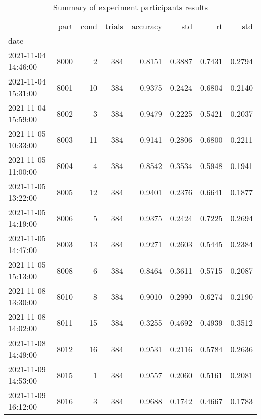 \begin{table}
\centering
\caption{Summary of experiment participants results}
\label{table-subject-summary}
\begin{tabular}{lrrrrrrr}
\toprule
{} &  part & cond & trials & accuracy &    std &     rt &    std \\
date                &       &      &        &          &        &        &        \\
\midrule
2021-11-04 14:46:00 &  8000 &    2 &    384 &   0.8151 & 0.3887 & 0.7431 & 0.2794 \\
2021-11-04 15:31:00 &  8001 &   10 &    384 &   0.9375 & 0.2424 & 0.6804 & 0.2140 \\
2021-11-04 15:59:00 &  8002 &    3 &    384 &   0.9479 & 0.2225 & 0.5421 & 0.2037 \\
2021-11-05 10:33:00 &  8003 &   11 &    384 &   0.9141 & 0.2806 & 0.6800 & 0.2211 \\
2021-11-05 11:00:00 &  8004 &    4 &    384 &   0.8542 & 0.3534 & 0.5948 & 0.1941 \\
2021-11-05 13:22:00 &  8005 &   12 &    384 &   0.9401 & 0.2376 & 0.6641 & 0.1877 \\
2021-11-05 14:19:00 &  8006 &    5 &    384 &   0.9375 & 0.2424 & 0.7225 & 0.2694 \\
2021-11-05 14:47:00 &  8003 &   13 &    384 &   0.9271 & 0.2603 & 0.5445 & 0.2384 \\
2021-11-05 15:13:00 &  8008 &    6 &    384 &   0.8464 & 0.3611 & 0.5715 & 0.2087 \\
2021-11-08 13:30:00 &  8010 &    8 &    384 &   0.9010 & 0.2990 & 0.6274 & 0.2190 \\
2021-11-08 14:02:00 &  8011 &   15 &    384 &   0.3255 & 0.4692 & 0.4939 & 0.3512 \\
2021-11-08 14:49:00 &  8012 &   16 &    384 &   0.9531 & 0.2116 & 0.5784 & 0.2636 \\
2021-11-09 14:53:00 &  8015 &    1 &    384 &   0.9557 & 0.2060 & 0.5161 & 0.2081 \\
2021-11-09 16:12:00 &  8016 &    3 &    384 &   0.9688 & 0.1742 & 0.4667 & 0.1783 \\
\bottomrule
\end{tabular}
\end{table}
